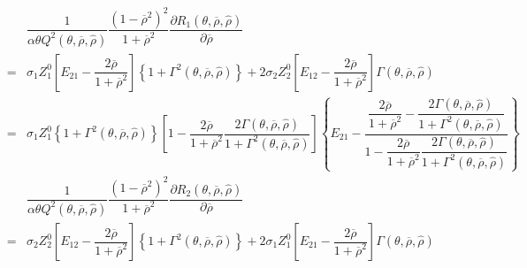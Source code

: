 \documentclass[10.0pt]{article}
\begin{document}
{\footnotesize \begin{eqnarray*}
& & \dfrac{1}{\alpha \theta Q^2 (\theta, \overline{\rho}, {\hat \rho})} \dfrac{(1 - \overline{\rho}^2)^2}{1 + \overline{\rho}^2} \dfrac{\partial R_1 (\theta, \overline{\rho}, {\hat \rho})}{\partial \overline{\rho}} \\
& = & \sigma_1 Z_1^0 \left[ E_{2 1} - \dfrac{2 \overline{\rho}}{1 + \overline{\rho}^2} \right] \left\{ 1 + \Gamma^2 (\theta, \overline{\rho}, {\hat \rho}) \right\} + 2 \sigma_2 Z_2^0 \left[ E_{1 2} - \dfrac{2 \overline{\rho}}{1 + \overline{\rho}^2} \right] \Gamma (\theta, \overline{\rho}, {\hat \rho}) \\
& = & \sigma_1 Z_1^0 \left\{ 1 + \Gamma^2 (\theta, \overline{\rho}, {\hat \rho}) \right\} \left[ 1 - \dfrac{2 \overline{\rho}}{1 + \overline{\rho}^2} \dfrac{2 \Gamma (\theta, \overline{\rho}, {\hat \rho})}{1 + \Gamma^2 (\theta, \overline{\rho}, {\hat \rho})} 
\right] \left\{ E_{2 1} - \dfrac{\dfrac{2 \overline{\rho}}{1 + \overline{\rho}^2} - \dfrac{2 \Gamma (\theta, \overline{\rho}, {\hat \rho})}{1 + \Gamma^2 (\theta, \overline{\rho}, {\hat \rho})}}{1 - \dfrac{2 \overline{\rho}}{1 + \overline{\rho}^2} \dfrac{2 \Gamma (\theta, \overline{\rho}, {\hat \rho})}{1 + \Gamma^2 (\theta, \overline{\rho}, {\hat \rho})}} \right\} \\
& & \dfrac{1}{\alpha \theta Q^2 (\theta, \overline{\rho}, {\hat \rho})} \dfrac{(1 - \overline{\rho}^2)^2}{1 + \overline{\rho}^2} \dfrac{\partial R_2 (\theta, \overline{\rho}, {\hat \rho})}{\partial \overline{\rho}} \\
& = & \sigma_2 Z_2^0 \left[ E_{1 2} - \dfrac{2 \overline{\rho}}{1 + \overline{\rho}^2} \right] \left\{ 1 + \Gamma^2 (\theta, \overline{\rho}, {\hat \rho}) \right\} + 2 \sigma_1 Z_1^0 \left[ E_{2 1} - \dfrac{2 \overline{\rho}}{1 + \overline{\rho}^2} \right] \Gamma (\theta, \overline{\rho}, {\hat \rho}) \\

\end{eqnarray*}}
\end{document}

